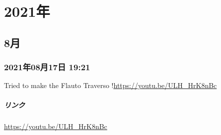\chapter{2021年}

\section{8月}

\subsection*{2021年08月17日 19:21}

Tried to make the Flauto Traverso !\url{https://youtu.be/ULH_HrK8nBc}

\paragraph{リンク}
\url{https://youtu.be/ULH_HrK8nBc}


